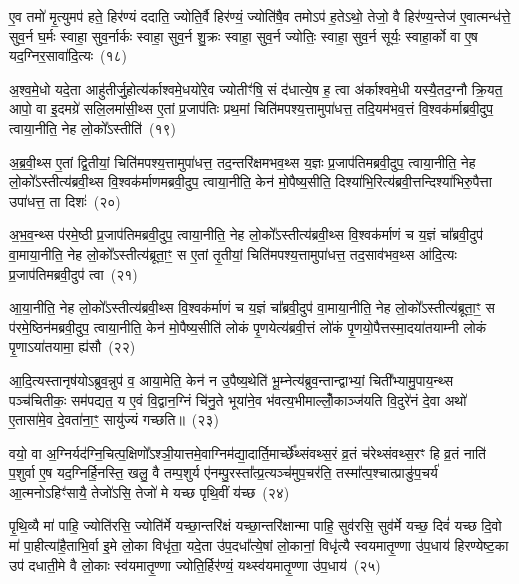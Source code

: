 ए॒व तमो॑ मृ॒त्युमप॑ हते॒ हिर॑ण्यं ददाति॒ ज्योति॒र्वै हिर॑ण्यं॒ ज्योति॑षै॒व तमो\-ऽप॑ ह॒ते\-ऽथो॒ तेजो॒ वै हिर॑ण्य॒न्तेज॑ ए॒वात्मन्ध॑त्ते॒ सुव॒र्न घ॒र्मः स्वाहा॒ सुव॒र्नार्कः स्वाहा॒ सुव॒र्न शु॒क्रः स्वाहा॒ सुव॒र्न ज्योतिः॒ स्वाहा॒ सुव॒र्न सूर्यः॒ स्वाहा॒र्को वा ए॒ष यद॒ग्निर॒सावा॑दि॒त्यः~(१८)

अ॒श्व॒मे॒धो यदे॒ता आहु॑तीर्जु॒होत्य॑र्काश्वमे॒धयो॑रे॒व ज्योतीꣳ॑षि॒ सं द॑धात्ये॒ष ह॒ त्वा अ॑र्काश्वमे॒धी यस्यै॒तद॒ग्नौ क्रि॒यत॒ आपो॒ वा इ॒दमग्रे॑ सलि॒लमा॑सी॒थ्स ए॒तां प्र॒जाप॑तिः प्रथ॒मां चिति॑मपश्य॒त्तामुपा॑धत्त॒ तदि॒यम॑भव॒त्तं वि॒श्वक॑र्माब्रवी॒दुप॒ त्वाया॒नीति॒ नेह लो॒को᳚\-ऽस्तीति॑~(१९)

अ॒ब्र॒वी॒थ्स ए॒तां द्वि॒तीयां॒ चिति॑मपश्य॒त्तामुपा॑धत्त॒ तद॒न्तरि॑क्षमभव॒थ्स य॒ज्ञः प्र॒जाप॑तिमब्रवी॒दुप॒ त्वाया॒नीति॒ नेह लो॒को᳚\-ऽस्तीत्य॑ब्रवी॒थ्स वि॒श्वक॑र्माणमब्रवी॒दुप॒ त्वाया॒नीति॒ केन॑ मो॒पैष्य॒सीति॒ दिश्या॑भि॒रित्य॑ब्रवी॒त्तन्दिश्या॑भिरु॒पैत्ता उपा॑धत्त॒ ता दिशः॑~(२०)

अ॒भ॒व॒न्थ्स प॑रमे॒ष्ठी प्र॒जाप॑तिमब्रवी॒दुप॒ त्वाया॒नीति॒ नेह लो॒को᳚\-ऽस्तीत्य॑ब्रवी॒थ्स वि॒श्वक॑र्माणं च य॒ज्ञं चा᳚ब्रवी॒दुप॑ वा॒माया॒नीति॒ नेह लो॒को᳚\-ऽस्तीत्य॑ब्रूता॒ꣳ॒ स ए॒तां तृ॒तीयां॒ चिति॑मपश्य॒त्तामुपा॑धत्त॒ तद॒साव॑भव॒थ्स आ॑दि॒त्यः प्र॒जाप॑तिमब्रवी॒दुप॑ त्वा~(२१)

आ॒या॒नीति॒ नेह लो॒को᳚\-ऽस्तीत्य॑ब्रवी॒थ्स वि॒श्वक॑र्माणं च य॒ज्ञं चा᳚ब्रवी॒दुप॑ वा॒माया॒नीति॒ नेह लो॒को᳚\-ऽस्तीत्य॑ब्रूता॒ꣳ॒ स प॑रमे॒ष्ठिन॑मब्रवी॒दुप॒ त्वाया॒नीति॒ केन॑ मो॒पैष्य॒सीति॑ लोकं पृ॒णयेत्य॑ब्रवी॒त्तं लो॑कं पृ॒णयो॒पैत्तस्मा॒दया॑तयाम्नी लोकं पृ॒णा\-ऽया॑तयामा॒ ह्य॑सौ~(२२)

आ॒दि॒त्यस्तानृष॑यो\-ऽब्रुव॒न्नुप॑ व॒ आया॒मेति॒ केन॑ न उ॒पैष्य॒थेति॑ भू॒म्नेत्य॑ब्रुव॒न्तान्द्वाभ्यां॒ चिती᳚भ्यामु॒पाय॒न्थ्स पञ्च॑चितीकः॒ सम॑पद्यत॒ य ए॒वं वि॒द्वान॒ग्निं चि॑नु॒ते भूया॑ने॒व भ॑वत्य॒भीमाल्लोँ॒काञ्ज॑यति वि॒दुरे॑नं दे॒वा अथो॑ ए॒तासा॑मे॒व दे॒वता॑ना॒ꣳ॒ सायु॑ज्यं गच्छति॥~(२३)

{\anuvakamend[{तम॑सा\-ऽ\-ऽदि॒त्यो᳚\-ऽस्तीति॒ दिश॑ आदि॒त्यः प्र॒जाप॑तिमब्रवी॒दुप॑ त्वा॒\-ऽसौ पञ्च॑चत्वारिꣳशच्च}]}%

वयो॒ वा अ॒ग्निर्यद॑ग्नि॒चित्प॒क्षिणो᳚\-ऽश्ञी॒यात्तमे॒वाग्निम॑द्या॒दार्ति॒मार्च्छे᳚थ्संवथ्स॒रं व्र॒तं च॑रेथ्संवथ्स॒रꣳ हि व्र॒तं नाति॑ प॒शुर्वा ए॒ष यद॒ग्निर्\mbox{}हि॒नस्ति॒ खलु॒ वै तम्प॒शुर्य ए॑नम्पु॒रस्ता᳚त्प्र॒त्यञ्च॑मुप॒चर॑ति॒ तस्मा᳚त्प॒श्चात्प्राङु॑प॒चर्य॑ आ॒त्मनो\-ऽहिꣳ॑सायै॒ तेजो॑\-ऽसि॒ तेजो॑ मे यच्छ पृथि॒वीं य॑च्छ~(२४)

पृ॒थि॒व्यै मा॑ पाहि॒ ज्योति॑रसि॒ ज्योति॑र्मे यच्छा॒न्तरि॑क्षं यच्छा॒न्तरि॑क्षान्मा पाहि॒ सुव॑रसि॒ सुव॑र्मे यच्छ॒ दिवं॑ यच्छ दि॒वो मा॑ पा॒हीत्या॑है॒ताभि॒र्वा इ॒मे लो॒का विधृ॑ता॒ यदे॒ता उ॑प॒दधा᳚त्ये॒षां लो॒कानां॒ विधृ॑त्यै स्वयमातृ॒ण्णा उ॑प॒धाय॑ हिरण्येष्ट॒का उप॑ दधाती॒मे वै लो॒काः स्व॑यमातृ॒ण्णा ज्योति॒र्\mbox{}हिर॑ण्यं॒ यथ्स्व॑यमातृ॒ण्णा उ॑प॒धाय॑~(२५)

